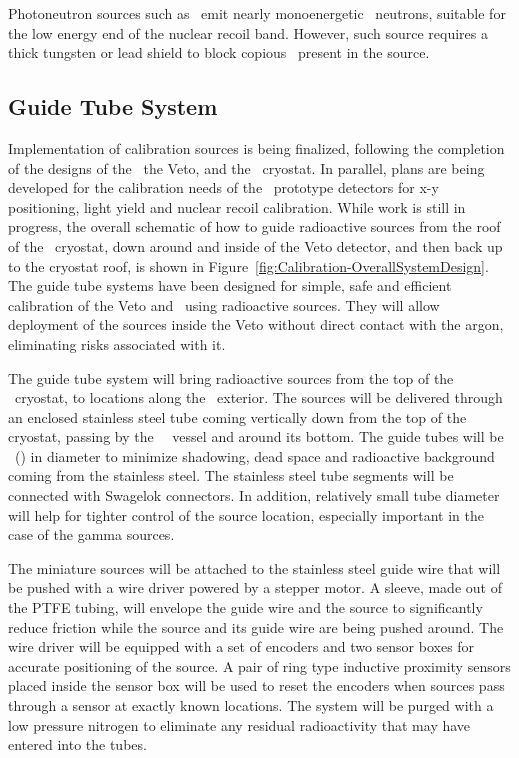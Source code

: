 Photoneutron sources such as \YBe\ emit nearly monoenergetic \YBeNeutronEnergy\ neutrons, suitable for the low energy end of the nuclear recoil band. However, such source requires a %
thick tungsten or lead shield to block copious \grs\ present in the source. 


\subsection{Guide Tube System}

Implementation of calibration sources is being finalized, following the completion of the designs of the \TPC\, the Veto, and the \AAr\ cryostat. In parallel, plans are being developed for the calibration needs of the \DSks\ prototype detectors for x-y positioning, light yield and nuclear recoil calibration. While work is still in progress, the overall schematic of how to guide radioactive sources from the roof of the \AAr\ cryostat, down around and inside of the Veto detector, and then back up to the cryostat roof, is shown in Figure~\ref{fig:Calibration-OverallSystemDesign}.  The guide tube systems have been designed for simple, safe and efficient calibration of the Veto and \TPC\ using radioactive sources. They will allow deployment of the sources inside the Veto without direct contact with the argon, eliminating risks associated with it. 

The guide tube system will bring radioactive sources from the top of the \AAr\ cryostat, to locations along the \TPC\ exterior. The sources will be delivered through an enclosed stainless steel tube coming vertically down from the top of the cryostat, passing by the \TPC\ \PMMA\ vessel and around its bottom. The guide tubes will be \CalGuideTubeDiameter\ (\CalGuideTubeDiameterInches) in diameter to minimize shadowing, dead space and radioactive background coming from the stainless steel. The stainless steel tube segments will be connected with Swagelok connectors. In addition, relatively small tube diameter will help for tighter control of the source location, especially important in the case of the gamma sources. 

The miniature sources will be attached to the stainless steel guide wire that will be pushed with a wire driver powered by a stepper motor. A sleeve, made out of the PTFE tubing, will envelope the guide wire and the source to significantly reduce friction while the source and its guide wire are being pushed around. The wire driver will be equipped with a set of encoders and two sensor boxes for accurate positioning of the source. A pair of ring type inductive proximity sensors placed inside the sensor box will be used to reset the encoders when sources pass through a sensor at exactly known locations. The system will be purged with a low pressure nitrogen to eliminate any residual radioactivity that may have entered into the tubes.

